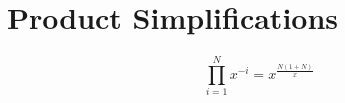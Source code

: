 \section{Product Simplifications}\label{app:Product_Simplifications}
\begin{equation}\label{eq:Geometric_Product}
  \prod\limits_{i=1}^{N} x^{-i} = x^{\frac{N (1+N)}{x}}
\end{equation}